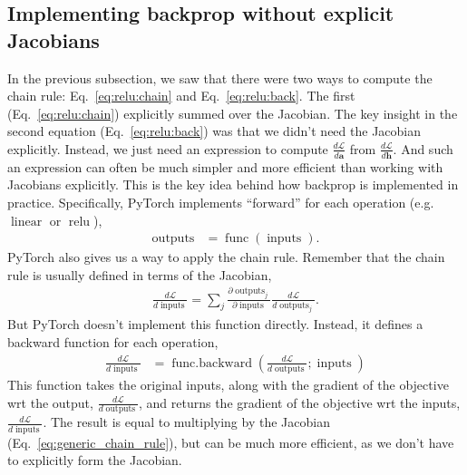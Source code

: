 \documentclass{article}
\newcommand{\dd}[2][]{\frac{\partial #1}{\partial #2}}
\newcommand{\dt}[2][]{\frac{d #1}{d #2}}
\newcommand{\dL}{\dt[\L]}
\newcommand{\bracket}[3]{\left#1 #3 \right#2}
\renewcommand{\b}{\bracket{(}{)}}
\newcommand{\h}{\mathbf{h}}
\renewcommand{\a}{\mathbf{a}}
\renewcommand{\L}{\mathcal{L}}
\newcommand{\linear}{\operatorname{linear}}
\newcommand{\relu}{\operatorname{relu}}
\newcommand{\func}{\operatorname{func}}
\newcommand{\funcback}{\operatorname{func{.}backward}}
\newcommand{\inputs}{\operatorname{inputs}}
\newcommand{\outputs}{\operatorname{outputs}}
\begin{document}
\subsection{Implementing backprop without explicit Jacobians}
In the previous subsection, we saw that there were two ways to compute the chain rule: Eq.~\eqref{eq:relu:chain} and Eq.~\eqref{eq:relu:back}.
The first (Eq.~\ref{eq:relu:chain}) explicitly summed over the Jacobian.
The key insight in the second equation (Eq.~\ref{eq:relu:back}) was that we didn't need the Jacobian explicitly.
Instead, we just need an expression to compute $\dL{\a}$ from $\dL{\h}$.
And such an expression can often be much simpler and more efficient than working with Jacobians explicitly.
This is the key idea behind how backprop is implemented in practice.
Specifically, PyTorch implements ``forward'' for each operation (e.g.\ $\linear$ or $\relu$),
\begin{align}
  \outputs &= \func\b{\inputs}.
\end{align}
PyTorch also gives us a way to apply the chain rule.
Remember that the chain rule is usually defined in terms of the Jacobian,
\begin{align}
  \label{eq:generic_chain_rule}
  \dL{\inputs} = \sum_j \dd[\outputs_j]{\inputs} \dL{\outputs_j}.
\end{align}
But PyTorch doesn't implement this function directly.  
Instead, it defines a backward function for each operation,
\begin{align}
\label{eq:general_forward_backward}
  \dL{\inputs} &= \funcback\b{\dL{\outputs}; \inputs}
\end{align}
This function takes the original inputs, along with the gradient of the objective wrt the output, $\dL{\outputs}$, and returns the gradient of the objective wrt the inputs, $\dL{\inputs}$.
The result is equal to multiplying by the Jacobian (Eq.~\eqref{eq:generic_chain_rule}), but can be much more efficient, as we don't have to explicitly form the Jacobian.
\end{document}
